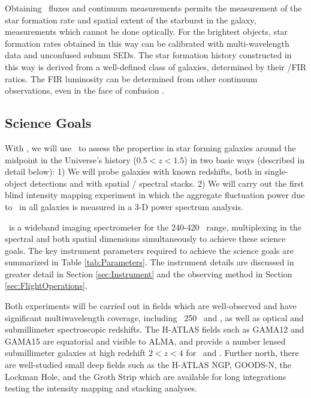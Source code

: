 Obtaining \cii\ fluxes and continuum measurements permits the
measurement of the star formation rate and spatial extent of the
starburst in the galaxy, measurements which cannot be done optically.
For the brightest objects, star formation rates obtained in this way
can be calibrated with multi-wavelength data and unconfused submm
SEDs.  The star formation history constructed in this way is derived
from a well-defined class of galaxies, determined by their \cii/FIR
ratios.  The FIR luminosity can be determined from other continuum
observations, even in the face of confusion \citep{crawford09}.

\subsection{Science Goals}

With \name, we will use \cii\ to assess the properties in star forming galaxies around the midpoint in the Universe's history ($0.5 < z < 1.5$) in two basic ways (described in detail below):   1) We will probe galaxies with known redshifts, both in single-object detections and with spatial / spectral stacks.   2) We will carry out the first blind intensity mapping experiment in which the aggregate fluctuation power due to \cii\ in all galaxies is measured in a 3-D power spectrum analysis.

\name\ is a wideband imaging spectrometer for the 240-420 \mum\ range, multiplexing in the spectral and both spatial dimensions simultaneously to achieve these science goals.  The key instrument parameters required to achieve the science goals are summarized in Table \ref{tab:Parameters}.  The
instrument details are discussed in greater detail in Section
\ref{sec:Instrument} and the observing method in Section
\ref{sec:FlightOperations}.

Both experiments will be carried out in fields which are well-observed and have significant multiwavelength coverage, including \herschel\  250 \mum\ and \spitzer, as well as optical and submillimeter spectroscopic redshifts.  The H-ATLAS fields such as GAMA12 and GAMA15 are equatorial and visible to ALMA, and provide a number lensed submillimeter galaxies at high redshift $2 < z < 4$ for \oi\ and \oiii.  Further north, there are well-studied small deep fields such as the H-ATLAS NGP, GOODS-N, the Lockman Hole, and the Groth Strip which are available for long integrations testing the intensity mapping and stacking analyses.


